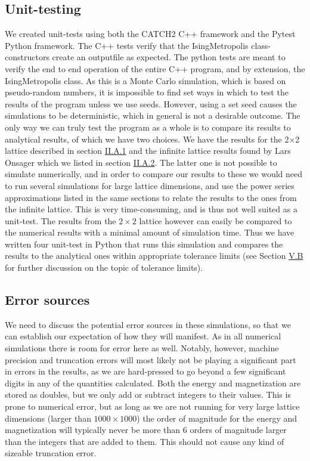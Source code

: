 \documentclass[reprint,english,notitlepage]{revtex4-1}  %
\begin{document}
\subsection{Unit-testing} \label{sec:III:B}

We created unit-tests using both the CATCH2 C++ framework and the Pytest Python framework. The C++ tests verify that the IsingMetropolis class-constructors create an outputfile as expected. The python tests are meant to verify the end to end operation of the entire C++ program, and by extension, the IsingMetropolis class. As this is a Monte Carlo simulation, which is based on pseudo-random numbers, it is impossible to find set ways in which to test the results of the program unless we use seeds. However, using a set seed causes the simulations to be deterministic, which in general is not a desirable outcome. The only way we can truly test the program as a whole is to compare its results to analytical results, of which we have two choices. We have the results for the 2$\times$2 lattice described in section \hyperref[sec:II.A.i]{II.A.1} and the infinite lattice results found by Lars Onsager \citep{L.Onsager1944} which we listed in section \hyperref[sec:II.A.ii]{II.A.2}. The latter one is not possible to simulate numerically, and in order to compare our results to these we would need to run several simulations for large lattice dimensions, and use the power series approximations listed in the same sections to relate the results to the ones from the infinite lattice. This is very time-consuming, and is thus not well suited as a unit-test. The results from the $2\times2$ lattice however can easily be compared to the numerical results with a minimal amount of simulation time. Thus we have written four unit-test in Python that runs this simulation and compares the results to the analytical ones within appropriate tolerance limits (see Section \hyperref[sec:V:B]{V.B} for further discussion on the topic of tolerance limits).      


\subsection{Error sources} \label{sec:III:C}

We need to discuss the potential error sources in these simulations, so that we can establish our expectation of how they will manifest. As in all numerical simulations there is room for error here as well. Notably, however, machine precision and truncation errors will most likely not be playing a significant part in errors in the results, as we are hard-pressed to go beyond a few significant digits in any of the quantities calculated. Both the energy and magnetization are stored as doubles, but we only add or subtract integers to their values. This is prone to numerical error, but as long as we are not running for very large lattice dimensions (larger than $1000\times 1000$) the order of magnitude for the energy and magnetization will typically never be more than 6 orders of magnitude larger than the integers that are added to them. This should not cause any kind of sizeable truncation error. 
\end{document}
